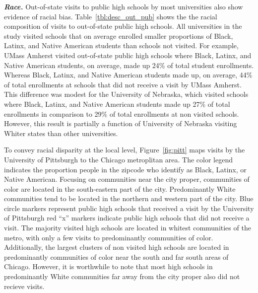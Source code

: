 \documentclass[twoside]{article}
\begin{document}
\textbf{\textit{Race.}} Out-of-state visits to public high schools by most universities also show evidence of racial bias. Table~\ref{tbl:desc_out_pub} shows the the racial composition of visits to out-of-state public high schools. All universities in the study visited schools that on average enrolled smaller proportions of Black, Latinx, and Native American students than schools not visited. For example, UMass Amherst visited out-of-state public high schools where Black, Latinx, and Native American students, on average, made up 24\% of total student enrollments. Whereas Black, Latinx, and Native American students made up, on average, 44\% of total enrollments at schools that did not receive a visit by UMass Amherst. This difference was modest for the University of Nebraska, which visited schools where Black, Latinx, and Native American students made up 27\% of total enrollments in comparison to 29\% of total enrollments at non visited schools. However, this result is partially a function of University of Nebraska visiting Whiter states than other universities.








To convey racial disparity at the local level, Figure~\ref{fig:pitt} maps visits by the University of Pittsburgh to the Chicago metroplitan area.  The color legend indicates the proportion people in the zipcode who identify as Black, Latinx, or Native American. Focusing on communities near the city proper, communities of color are located in the south-eastern part of the city. Predominantly White communities tend to be located in the northern and western part of the city. Blue circle markers represent public high schools that received a visit by the University of Pittsburgh red ``x'' markers indicate public high schools that did not receive a visit. The majority visited high schools are located in whitest communities of the metro, with only a few visits to predominantly communities of color. Additionally, the largest clusters of non visited high schools are located in predominantly communities of color near the south and far south areas of Chicago. However, it is worthwhile to note that most high schools in predominantly White communities far away from the city proper also did not recieve visits.
\end{document}
